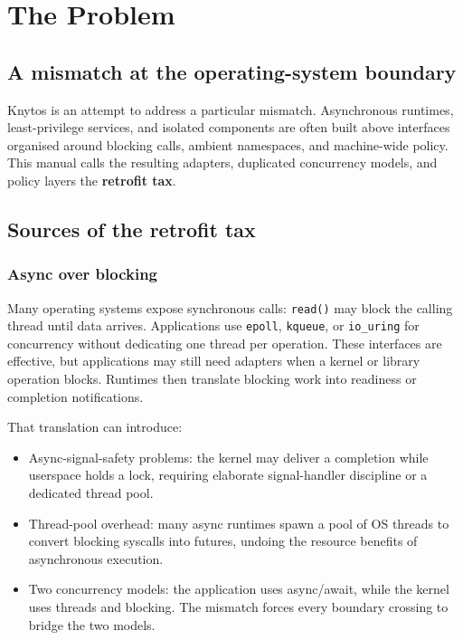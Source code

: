 \chapter{The Problem}
\label{chap:problem}

\section{A mismatch at the operating-system boundary}

Knytos is an attempt to address a particular mismatch. Asynchronous runtimes,
least-privilege services, and isolated components are often built above interfaces
organised around blocking calls, ambient namespaces, and machine-wide policy.
This manual calls the resulting adapters, duplicated concurrency models, and policy
layers the \textbf{retrofit tax}.

\section{Sources of the retrofit tax}

\subsection{Async over blocking}

Many operating systems expose synchronous calls: \texttt{read()} may block the
calling thread until data arrives. Applications use \texttt{epoll}, \texttt{kqueue},
or \texttt{io\_uring} for concurrency without dedicating one thread per operation.
These interfaces are effective, but applications may still need adapters when a
kernel or library operation blocks. Runtimes then translate blocking work into
readiness or completion notifications.

That translation can introduce:
\begin{itemize}
    \item Async-signal-safety problems: the kernel may deliver a
        completion while userspace holds a lock, requiring elaborate
        signal-handler discipline or a dedicated thread pool.
    \item Thread-pool overhead: many async runtimes spawn a pool of OS
        threads to convert blocking syscalls into futures, undoing the
        resource benefits of asynchronous execution.
    \item Two concurrency models: the application uses async/await, while the
        kernel uses threads and blocking. The mismatch forces every boundary
        crossing to bridge the two models.
\end{itemize}


